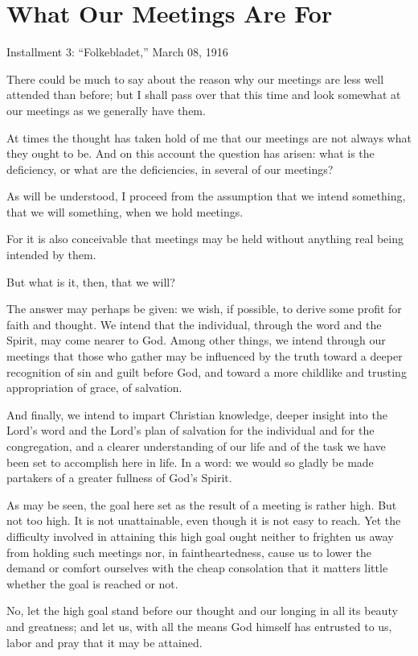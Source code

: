 \section{What Our Meetings Are For}

Installment 3: “Folkebladet,” March 08, 1916

There could be much to say about the reason why our meetings are less well attended than before; but I shall pass over that this time and look somewhat at our meetings as we generally have them.

At times the thought has taken hold of me that our meetings are not always what they ought to be. And on this account the question has arisen: what is the deficiency, or what are the deficiencies, in several of our meetings?

As will be understood, I proceed from the assumption that we intend something, that we will something, when we hold meetings.

For it is also conceivable that meetings may be held without anything real being intended by them.

But what is it, then, that we will?

The answer may perhaps be given: we wish, if possible, to derive some profit for faith and thought. We intend that the individual, through the word and the Spirit, may come nearer to God. Among other things, we intend through our meetings that those who gather may be influenced by the truth toward a deeper recognition of sin and guilt before God, and toward a more childlike and trusting appropriation of grace, of salvation.

And finally, we intend to impart Christian knowledge, deeper insight into the Lord’s word and the Lord’s plan of salvation for the individual and for the congregation, and a clearer understanding of our life and of the task we have been set to accomplish here in life. In a word: we would so gladly be made partakers of a greater fullness of God’s Spirit.

As may be seen, the goal here set as the result of a meeting is rather high. But not too high. It is not unattainable, even though it is not easy to reach. Yet the difficulty involved in attaining this high goal ought neither to frighten us away from holding such meetings nor, in faintheartedness, cause us to lower the demand or comfort ourselves with the cheap consolation that it matters little whether the goal is reached or not.

No, let the high goal stand before our thought and our longing in all its beauty and greatness; and let us, with all the means God himself has entrusted to us, labor and pray that it may be attained.

